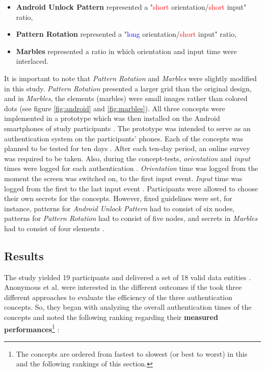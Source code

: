 \begin{itemize}
    \item \textbf{Android Unlock Pattern} represented a "\textcolor{red}{short} orientation/\textcolor{red}{short} input" ratio,
    \item \textbf{Pattern Rotation} represented a "\textcolor{blue}{long} orientation/\textcolor{red}{short} input" ratio,
    \item \textbf{Marbles} represented a ratio in which orientation and input time were interlaced.
\end{itemize}

It is important to note that \textit{Pattern Rotation} and \textit{Marbles} \cite{Marbles} were slightly modified in this study. \textit{Pattern Rotation} presented a larger grid than the original design, and in \textit{Marbles}, the elements (marbles) were small images rather than colored dots (see figure \ref{fig:android} and \ref{fig:marbles}). All three concepts were implemented in a prototype which was then installed on the Android smartphones of study participants \cite{anonymous}. The prototype was intended to serve as an authentication system on the participants' phones. Each of the concepts was planned to be tested for ten days \cite{anonymous}. After each ten-day period, an online survey was required to be taken. Also, during the concept-tests, \textit{orientation} and \textit{input} times were logged for each authentication \cite{anonymous}. \textit{Orientation} time was logged from the moment the screen was switched on, to the first input event. \textit{Input} time was logged from the first to the last input event \cite{anonymous}. Participants were allowed to choose their own secrets for the concepts. However, fixed guidelines were set, for instance, patterns for \textit{Android Unlock Pattern} had to consist of six nodes, patterns for \textit{Pattern Rotation} had to consist of five nodes, and secrets in \textit{Marbles} had to consist of four elements \cite{anonymous}.

\subsection{Results}

The study yielded 19 participants and delivered a set of 18 valid data entities \cite{anonymous}. Anonymous et al. \cite{anonymous} were interested in the different outcomes if the took three different approaches to evaluate the efficiency of the three authentication concepts. So, they began with analyzing the overall authentication times of the concepts and noted the following ranking regarding their \textbf{measured performances}\footnote{The concepts are ordered from fastest to slowest (or best to worst) in this and the following rankings of this section.} \cite{anonymous}:

